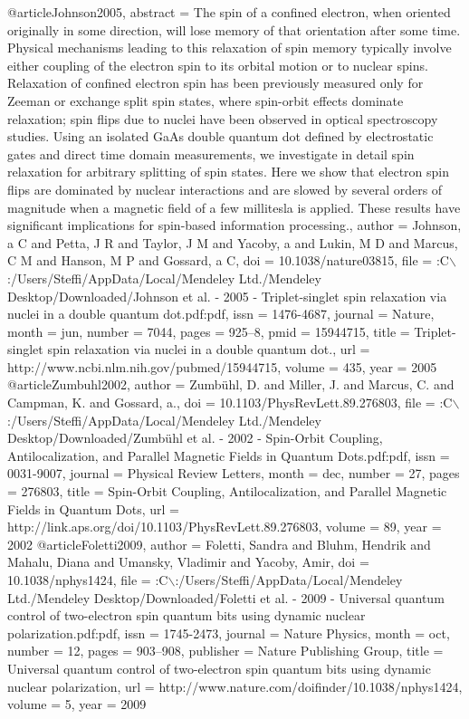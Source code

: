 @article{Johnson2005,
abstract = {The spin of a confined electron, when oriented originally in some direction, will lose memory of that orientation after some time. Physical mechanisms leading to this relaxation of spin memory typically involve either coupling of the electron spin to its orbital motion or to nuclear spins. Relaxation of confined electron spin has been previously measured only for Zeeman or exchange split spin states, where spin-orbit effects dominate relaxation; spin flips due to nuclei have been observed in optical spectroscopy studies. Using an isolated GaAs double quantum dot defined by electrostatic gates and direct time domain measurements, we investigate in detail spin relaxation for arbitrary splitting of spin states. Here we show that electron spin flips are dominated by nuclear interactions and are slowed by several orders of magnitude when a magnetic field of a few millitesla is applied. These results have significant implications for spin-based information processing.},
author = {Johnson, a C and Petta, J R and Taylor, J M and Yacoby, a and Lukin, M D and Marcus, C M and Hanson, M P and Gossard, a C},
doi = {10.1038/nature03815},
file = {:C$\backslash$:/Users/Steffi/AppData/Local/Mendeley Ltd./Mendeley Desktop/Downloaded/Johnson et al. - 2005 - Triplet-singlet spin relaxation via nuclei in a double quantum dot.pdf:pdf},
issn = {1476-4687},
journal = {Nature},
month = {jun},
number = {7044},
pages = {925--8},
pmid = {15944715},
title = {{Triplet-singlet spin relaxation via nuclei in a double quantum dot.}},
url = {http://www.ncbi.nlm.nih.gov/pubmed/15944715},
volume = {435},
year = {2005}
}
@article{Zumbuhl2002,
author = {Zumb{\"{u}}hl, D. and Miller, J. and Marcus, C. and Campman, K. and Gossard, a.},
doi = {10.1103/PhysRevLett.89.276803},
file = {:C$\backslash$:/Users/Steffi/AppData/Local/Mendeley Ltd./Mendeley Desktop/Downloaded/Zumb{\"{u}}hl et al. - 2002 - Spin-Orbit Coupling, Antilocalization, and Parallel Magnetic Fields in Quantum Dots.pdf:pdf},
issn = {0031-9007},
journal = {Physical Review Letters},
month = {dec},
number = {27},
pages = {276803},
title = {{Spin-Orbit Coupling, Antilocalization, and Parallel Magnetic Fields in Quantum Dots}},
url = {http://link.aps.org/doi/10.1103/PhysRevLett.89.276803},
volume = {89},
year = {2002}
}
@article{Foletti2009,
author = {Foletti, Sandra and Bluhm, Hendrik and Mahalu, Diana and Umansky, Vladimir and Yacoby, Amir},
doi = {10.1038/nphys1424},
file = {:C$\backslash$:/Users/Steffi/AppData/Local/Mendeley Ltd./Mendeley Desktop/Downloaded/Foletti et al. - 2009 - Universal quantum control of two-electron spin quantum bits using dynamic nuclear polarization.pdf:pdf},
issn = {1745-2473},
journal = {Nature Physics},
month = {oct},
number = {12},
pages = {903--908},
publisher = {Nature Publishing Group},
title = {{Universal quantum control of two-electron spin quantum bits using dynamic nuclear polarization}},
url = {http://www.nature.com/doifinder/10.1038/nphys1424},
volume = {5},
year = {2009}
}
